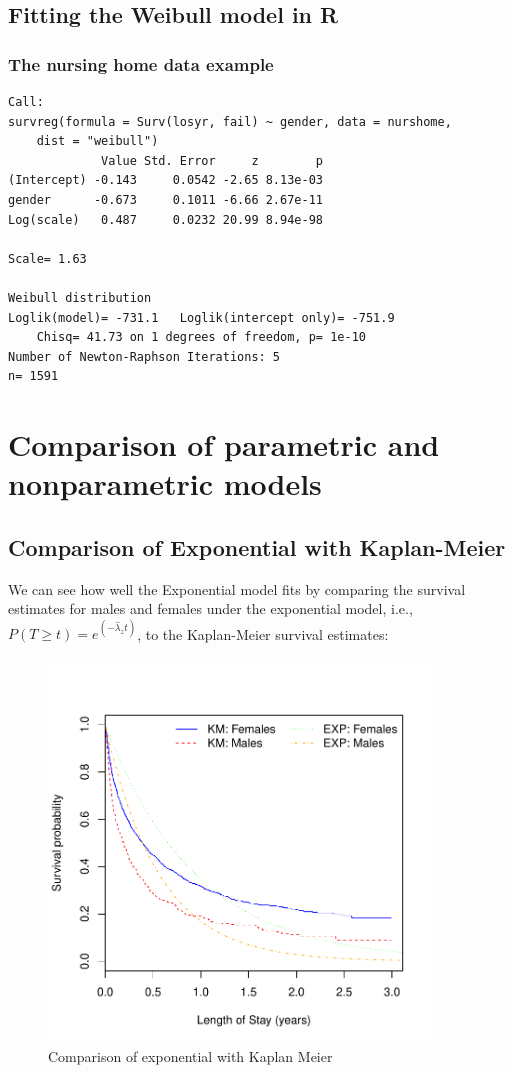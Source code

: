 \documentclass[11pt,psfig]{book}
\begin{document}
\subsection{Fitting the Weibull model in R}
\subsubsection{The nursing home data example}
\small
\begin{verbatim}
Call:
survreg(formula = Surv(losyr, fail) ~ gender, data = nurshome,
    dist = "weibull")
             Value Std. Error     z        p
(Intercept) -0.143     0.0542 -2.65 8.13e-03
gender      -0.673     0.1011 -6.66 2.67e-11
Log(scale)   0.487     0.0232 20.99 8.94e-98

Scale= 1.63

Weibull distribution
Loglik(model)= -731.1   Loglik(intercept only)= -751.9
	Chisq= 41.73 on 1 degrees of freedom, p= 1e-10
Number of Newton-Raphson Iterations: 5
n= 1591
\end{verbatim}
\normalsize
\section{Comparison of parametric and nonparametric models}
\subsection{Comparison of Exponential with Kaplan-Meier}
We can see how well the Exponential model fits by comparing
the survival estimates for males and females under the exponential
model, i.e., $P(T\ge t)=e^{(-\hat\lambda_z t)}$, to the Kaplan-Meier
survival estimates:
\begin{figure}[h!]
\caption{Comparison of exponential with Kaplan Meier}
\centerline{\includegraphics[width=4in]{ch12exp.pdf}}
\end{figure}
\end{document}

